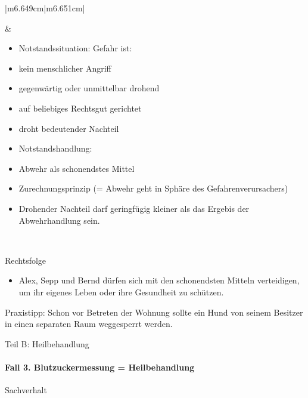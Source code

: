 \documentclass{article}
\begin{document}
\begin{center}
\begin{supertabular}{|m{6.649cm}|m{6.651cm}|}
\begin{itemize}
\end{itemize}
 &
\begin{itemize}
\item Notstandssituation: Gefahr ist:

\end{itemize}
\begin{itemize}
\item kein menschlicher Angriff

\item gegenw\"artig oder unmittelbar drohend

\item auf beliebiges Rechtsgut gerichtet

\item droht bedeutender Nachteil

\end{itemize}
\begin{itemize}
\item Notstandshandlung: 

\end{itemize}
\begin{itemize}
\item Abwehr als schonendstes Mittel

\item Zurechnungsprinzip (= Abwehr geht in Sph\"are des
Gefahrenverursachers)

\item Drohender Nachteil darf geringf\"ugig kleiner als das Ergebis der
Abwehrhandlung sein.

\end{itemize}
\\\hline
\end{supertabular}
\end{center}
Rechtsfolge

\begin{itemize}
\item Alex, Sepp und Bernd d\"urfen sich mit den schonendsten Mitteln
verteidigen, um ihr eigenes Leben oder ihre Gesundheit zu sch\"utzen.

\end{itemize}
Praxistipp: Schon vor Betreten der Wohnung sollte ein Hund von seinem
Besitzer in einen  separaten Raum weggesperrt werden.

Teil B: Heilbehandlung

\paragraph{Fall 3. Blutzuckermessung = Heilbehandlung}
Sachverhalt
\end{document}
